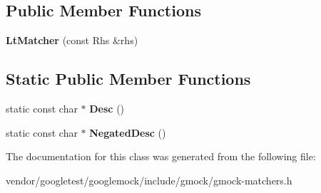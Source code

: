 \subsection*{Public Member Functions}
\begin{DoxyCompactItemize}
\item 
\mbox{\label{classtesting_1_1internal_1_1_lt_matcher_af5275d78fc5499e4757f1b3ecca67e15}} 
{\bfseries Lt\+Matcher} (const Rhs \&rhs)
\end{DoxyCompactItemize}
\subsection*{Static Public Member Functions}
\begin{DoxyCompactItemize}
\item 
\mbox{\label{classtesting_1_1internal_1_1_lt_matcher_aeb101aafbf1c074ccbb3df1496487746}} 
static const char $\ast$ {\bfseries Desc} ()
\item 
\mbox{\label{classtesting_1_1internal_1_1_lt_matcher_ab62db503e9e0293b4a2d22a96c140b10}} 
static const char $\ast$ {\bfseries Negated\+Desc} ()
\end{DoxyCompactItemize}


The documentation for this class was generated from the following file\+:\begin{DoxyCompactItemize}
\item 
vendor/googletest/googlemock/include/gmock/gmock-\/matchers.\+h\end{DoxyCompactItemize}
